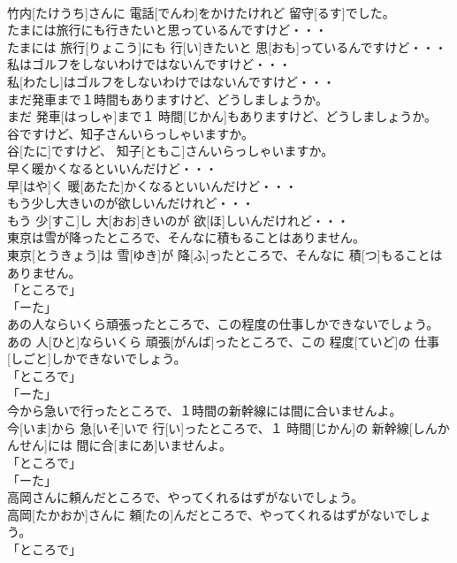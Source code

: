 \documentclass[8pt]{extreport}
\begin{document}
\begin{CJK}{UTF8}{min}
\\	竹内[たけうち]さんに 電話[でんわ]をかけたけれど 留守[るす]でした。	
\\	たまには旅行にも行きたいと思っているんですけど・・・	
\\	たまには 旅行[りょこう]にも 行[い]きたいと 思[おも]っているんですけど・・・	
\\	私はゴルフをしないわけではないんですけど・・・	
\\	私[わたし]はゴルフをしないわけではないんですけど・・・	
\\	まだ発車まで１時間もありますけど、どうしましょうか。	
\\	まだ 発車[はっしゃ]まで１ 時間[じかん]もありますけど、どうしましょうか。	
\\	谷ですけど、知子さんいらっしゃいますか。	
\\	谷[たに]ですけど、 知子[ともこ]さんいらっしゃいますか。	
\\	早く暖かくなるといいんだけど・・・	
\\	早[はや]く 暖[あたた]かくなるといいんだけど・・・	
\\	もう少し大きいのが欲しいんだけれど・・・	
\\	もう 少[すこ]し 大[おお]きいのが 欲[ほ]しいんだけれど・・・	
\\	東京は雪が降ったところで、そんなに積もることはありません。	
\\	東京[とうきょう]は 雪[ゆき]が 降[ふ]ったところで、そんなに 積[つ]もることはありません。	
\\	「ところで」
\\	「ーた」
\\	あの人ならいくら頑張ったところで、この程度の仕事しかできないでしょう。	
\\	あの 人[ひと]ならいくら 頑張[がんば]ったところで、この 程度[ていど]の 仕事[しごと]しかできないでしょう。	
\\	「ところで」
\\	「ーた」
\\	今から急いで行ったところで、１時間の新幹線には間に合いませんよ。	
\\	今[いま]から 急[いそ]いで 行[い]ったところで、１ 時間[じかん]の 新幹線[しんかんせん]には 間に合[まにあ]いませんよ。	
\\	「ところで」
\\	「ーた」
\\	高岡さんに頼んだところで、やってくれるはずがないでしょう。	
\\	高岡[たかおか]さんに 頼[たの]んだところで、やってくれるはずがないでしょう。	
\\	「ところで」

\end{CJK}
\end{document}
